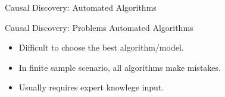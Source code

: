 \documentclass[aspectratio=169]{beamer}
\begin{document}
\begin{frame}[fragile]{Causal Discovery: Automated Algorithms}
\end{frame}

\begin{frame}{Causal Discovery: Problems Automated Algorithms}
	\begin{itemize}
		\item Difficult to choose the best algorithm/model.
		\item In finite sample scenario, all algorithms make mistakes.
		\item Usually requires expert knowlege input.
	\end{itemize}

	\vspace{2em}

\end{frame}
\end{document}
